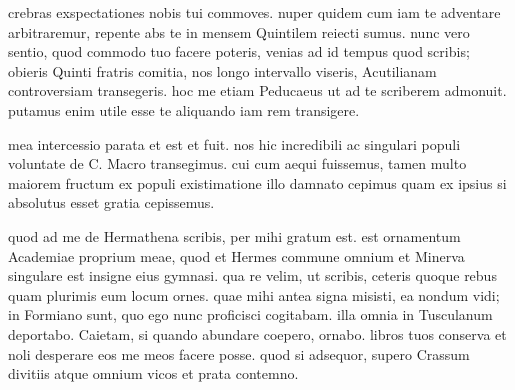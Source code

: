 


 crebras exspectationes nobis tui commoves. nuper quidem cum iam te adventare arbitraremur, repente abs te in mensem Quintilem reiecti sumus. nunc vero sentio, quod commodo tuo facere poteris, venias ad id tempus quod scribis; obieris Quinti fratris comitia, nos longo intervallo viseris, Acutilianam controversiam transegeris. hoc me etiam Peducaeus ut ad te scriberem admonuit. putamus enim utile esse te aliquando iam rem transigere.

 mea intercessio parata et est et fuit. nos hic incredibili ac singulari populi voluntate de C. Macro transegimus. cui cum aequi fuissemus, tamen multo maiorem fructum ex populi existimatione illo damnato cepimus quam ex ipsius si absolutus esset gratia cepissemus.

 quod ad me de Hermathena scribis, per mihi gratum est. est ornamentum Academiae proprium meae, quod et Hermes commune omnium et Minerva singulare est insigne eius gymnasi. qua re velim, ut scribis, ceteris quoque rebus quam plurimis eum locum ornes. quae mihi antea signa misisti, ea nondum vidi; in Formiano sunt, quo ego nunc proficisci cogitabam. illa omnia in Tusculanum deportabo. Caietam, si quando abundare coepero, ornabo. libros tuos conserva et noli desperare eos me meos facere posse. quod si adsequor, supero Crassum divitiis atque omnium vicos et prata contemno.
